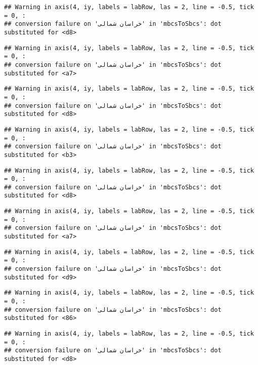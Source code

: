 \documentclass[
]{article}
\begin{document}
\begin{verbatim}
## Warning in axis(4, iy, labels = labRow, las = 2, line = -0.5, tick = 0, :
## conversion failure on 'خراسان شمالی' in 'mbcsToSbcs': dot substituted for <d8>
\end{verbatim}

\begin{verbatim}
## Warning in axis(4, iy, labels = labRow, las = 2, line = -0.5, tick = 0, :
## conversion failure on 'خراسان شمالی' in 'mbcsToSbcs': dot substituted for <a7>
\end{verbatim}

\begin{verbatim}
## Warning in axis(4, iy, labels = labRow, las = 2, line = -0.5, tick = 0, :
## conversion failure on 'خراسان شمالی' in 'mbcsToSbcs': dot substituted for <d8>
\end{verbatim}

\begin{verbatim}
## Warning in axis(4, iy, labels = labRow, las = 2, line = -0.5, tick = 0, :
## conversion failure on 'خراسان شمالی' in 'mbcsToSbcs': dot substituted for <b3>
\end{verbatim}

\begin{verbatim}
## Warning in axis(4, iy, labels = labRow, las = 2, line = -0.5, tick = 0, :
## conversion failure on 'خراسان شمالی' in 'mbcsToSbcs': dot substituted for <d8>
\end{verbatim}

\begin{verbatim}
## Warning in axis(4, iy, labels = labRow, las = 2, line = -0.5, tick = 0, :
## conversion failure on 'خراسان شمالی' in 'mbcsToSbcs': dot substituted for <a7>
\end{verbatim}

\begin{verbatim}
## Warning in axis(4, iy, labels = labRow, las = 2, line = -0.5, tick = 0, :
## conversion failure on 'خراسان شمالی' in 'mbcsToSbcs': dot substituted for <d9>
\end{verbatim}

\begin{verbatim}
## Warning in axis(4, iy, labels = labRow, las = 2, line = -0.5, tick = 0, :
## conversion failure on 'خراسان شمالی' in 'mbcsToSbcs': dot substituted for <86>
\end{verbatim}

\begin{verbatim}
## Warning in axis(4, iy, labels = labRow, las = 2, line = -0.5, tick = 0, :
## conversion failure on 'خراسان شمالی' in 'mbcsToSbcs': dot substituted for <d8>
\end{verbatim}
\end{document}

